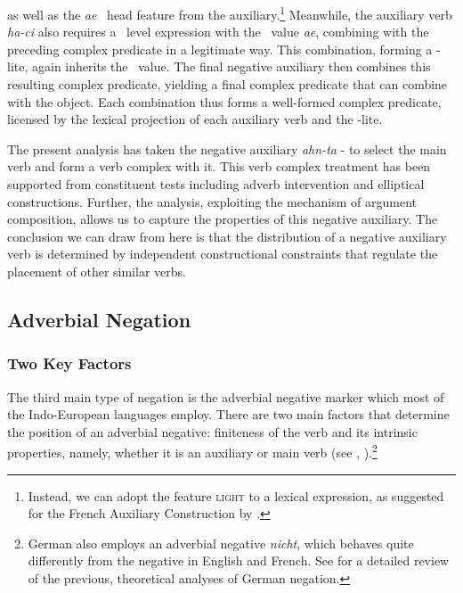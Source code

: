 \documentclass[output=paper]{langsci/langscibook}
\begin{document}
{as well as the \textit{ae} \VFORM\ head feature from the auxiliary.\footnote{Instead,
we can adopt the feature \textsc{light} to a lexical expression, as suggested for
the French Auxiliary Construction by \citet{AG:97}.} Meanwhile,
the auxiliary verb \textit{ha-ci} also requires a \LITE\  level
expression with the \VFORM\ value {\textit{ae}}, combining
with the preceding complex predicate in a legitimate way.
This combination, forming a \hd-lite, again inherits  the \COMPS\
value. The final negative
auxiliary then combines this resulting complex predicate,
yielding a final complex predicate that can combine with the object. Each combination thus
forms a well-formed complex predicate, licensed by the lexical projection
of each auxiliary verb and the \hd-lite.

The present analysis has taken the negative auxiliary \textit{ahn-ta} \NEG-\DECL
to select the main verb and form a verb complex with it.
This verb complex treatment has been supported from
constituent tests including
 adverb intervention and elliptical constructions. Further, the analysis,
exploiting the mechanism of argument composition,
allows us to capture the properties of this negative
auxiliary.
The conclusion we can draw from here is that the
 distribution of a negative auxiliary verb is determined by
independent constructional constraints
that regulate the placement of other
similar verbs.



\subsection{Adverbial Negation}

\subsubsection{Two Key Factors}

The third main type of negation is
the adverbial negative marker which most of the Indo-European
languages employ. There are two main factors
that determine the position of an adverbial negative: finiteness of
the verb and its intrinsic properties, namely, whether it is an auxiliary
or main verb (see \citet{Kim:00}, \citet{KS:02}).\footnote{German also
employs an adverbial negative \emph{nicht}, which behaves quite
differently from the negative in English and French. See \citet{MuellerGT-Eng1}
for a detailed review of the previous, theoretical analyses of German negation.}

}
\end{document}
